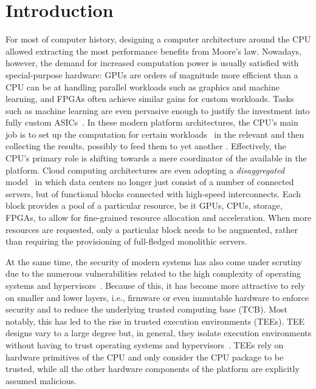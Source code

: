 \section{Introduction}
\label{sec: intro}

For most of computer history, designing a computer architecture around the CPU allowed extracting the most performance benefits from Moore's law.  %
Nowadays, however, the demand for increased computation power is usually satisfied with special-purpose hardware: GPUs are orders of magnitude more efficient than a CPU can be at handling parallel workloads such as graphics and machine learning, and FPGAs often achieve similar gains for custom workloads. Tasks such as machine learning are even pervasive enough to justify the investment into fully custom ASICs~\cite{TPU}. %
In these modern platform architectures, the CPU's main job is to set up the computation for certain workloads~\cite{spec_hw_acc} in the relevant \sphw and then collecting the results, possibly to feed them to yet another \sphw. Effectively, the CPU's primary role is shifting towards a mere coordinator of the available \sphw in the platform.
Cloud computing architectures are even adopting a \emph{disaggregated} model~\cite{disaggregatedcomp} in which data centers no longer just consist of a number of connected servers, but of functional blocks connected with high-speed interconnects. Each block provides a pool of a particular resource, be it GPUs, CPUs, storage, FPGAs, to allow for fine-grained resource allocation and acceleration. When more resources are requested, only a particular block needs to be augmented, rather than requiring the provisioning of full-fledged monolithic servers.



At the same time, the security of modern systems has also come under scrutiny due to the numerous vulnerabilities related to the high complexity of operating systems and hypervisors~\cite{checkoway2013iago,suzaki2011memory}.
Because of this, it has become more attractive to rely on smaller and lower layers, i.e., firmware or even immutable hardware to enforce security and to reduce the underlying trusted computing base (TCB).
Most notably, this has led to the rise in trusted execution environments (TEEs). 
TEE designs vary to a large degree but, in general, they isolate execution environments without having to trust operating systems and hypervisors~\cite{costan2016intel,winter2008trusted,costan2016sanctum}. TEEs rely on hardware primitives of the CPU and only consider the CPU package to be trusted, while all the other hardware components of the platform are explicitly assumed malicious. 

